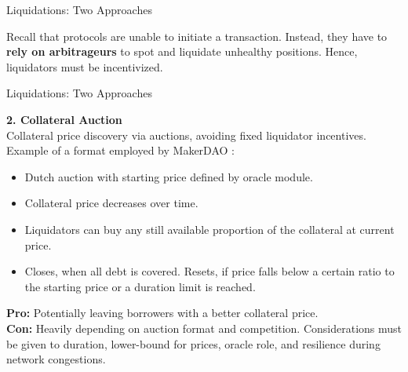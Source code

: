 \documentclass[handout]{beamer}
\begin{document}
\begin{frame}{Liquidations: Two Approaches}

Recall that protocols are unable to initiate a transaction. Instead, they have to \textbf{rely on arbitrageurs} to spot and liquidate unhealthy positions. Hence, liquidators must be incentivized. 


\end{frame}


\begin{frame}{Liquidations: Two Approaches }


\textbf{2. Collateral Auction}\\
\vspace{0.2em}
Collateral price discovery via auctions, avoiding fixed liquidator incentives. Example of a format employed by MakerDAO \cite{MakerDAO}:
\begin{itemize}
\item Dutch auction with starting price defined by oracle module. 
\item Collateral price decreases over time. 
\item Liquidators can buy any still available proportion of the collateral at current price.
\item Closes, when all debt is covered. Resets, if price falls below a certain ratio to the starting price or a duration limit is reached.
\end{itemize}
\vspace{0.5em}

\textbf{Pro:} Potentially leaving borrowers with a better collateral price.\\
\vspace{0.5em}
\textbf{Con:} Heavily depending on auction format and competition. Considerations must be given to duration, lower-bound for  prices, oracle role, and resilience during network congestions.

\end{frame}
\end{document}
